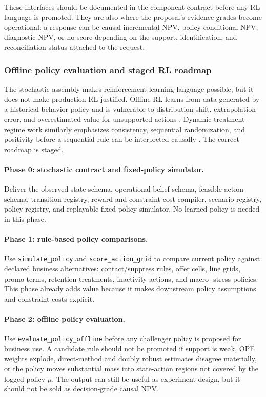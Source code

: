 \documentclass[11pt]{article}
\newcommand{\1}{\mathbf{1}}
\newcommand{\code}[1]{\nolinkurl{#1}}
\begin{document}
These interfaces should be documented in the component contract before any RL
language is promoted. They are also where the proposal's evidence grades become
operational: a response can be causal incremental NPV, policy-conditional NPV,
diagnostic NPV, or no-score depending on the support, identification, and
reconciliation status attached to the request.

\subsubsection{Offline policy evaluation and staged RL roadmap}
\label{subsec:state-space-ope-rl-roadmap}

The stochastic assembly makes reinforcement-learning language possible, but it
does not make production RL justified. Offline RL learns from data generated by a
historical behavior policy and is vulnerable to distribution shift,
extrapolation error, and overestimated value for unsupported actions
\citep{levine2020offline,fujimoto2019bcq,kumar2020cql}. Dynamic-treatment-regime
work similarly emphasizes consistency, sequential randomization, and positivity
before a sequential rule can be interpreted causally
\citep{murphy2003dynamic,schulte2014qlearning,laber2010inference}. The correct
roadmap is staged.

\paragraph{Phase 0: stochastic contract and fixed-policy simulator.}
Deliver the observed-state schema, operational belief schema, feasible-action
schema, transition registry, reward and constraint-cost compiler, scenario
registry, policy registry, and replayable fixed-policy simulator. No learned
policy is needed in this phase.

\paragraph{Phase 1: rule-based policy comparisons.}
Use \code{simulate_policy} and \code{score_action_grid} to compare current policy
against declared business alternatives: contact/suppress rules, offer cells,
line grids, promo terms, retention treatments, inactivity actions, and macro-
stress policies. This phase already adds value because it makes downstream
policy assumptions and constraint costs explicit.

\paragraph{Phase 2: offline policy evaluation.}
Use \code{evaluate_policy_offline} before any challenger policy is proposed for
business use. A candidate rule should not be promoted if support is weak, OPE
weights explode, direct-method and doubly robust estimates disagree materially,
or the policy moves substantial mass into state-action regions not covered by
the logged policy $\mu$. The output can still be useful as experiment design,
but it should not be sold as decision-grade causal NPV.
\end{document}
